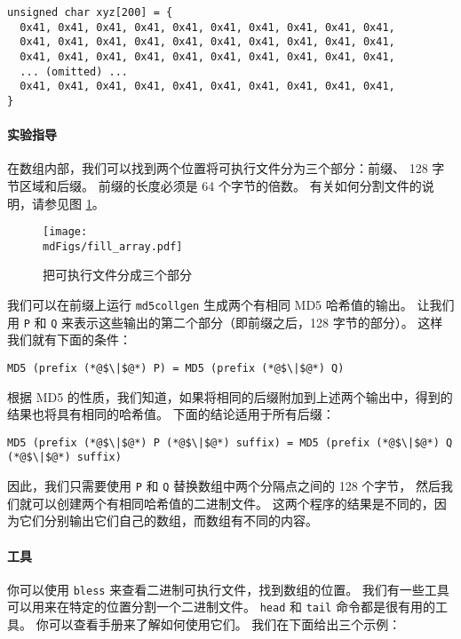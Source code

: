 \begin{lstlisting}
unsigned char xyz[200] = {
  0x41, 0x41, 0x41, 0x41, 0x41, 0x41, 0x41, 0x41, 0x41, 0x41,
  0x41, 0x41, 0x41, 0x41, 0x41, 0x41, 0x41, 0x41, 0x41, 0x41,
  0x41, 0x41, 0x41, 0x41, 0x41, 0x41, 0x41, 0x41, 0x41, 0x41,
  ... (omitted) ...
  0x41, 0x41, 0x41, 0x41, 0x41, 0x41, 0x41, 0x41, 0x41, 0x41,
}
\end{lstlisting}


\paragraph{实验指导}
在数组内部，我们可以找到两个位置将可执行文件分为三个部分：前缀、 128 字节区域和后缀。
前缀的长度必须是 64 个字节的倍数。
有关如何分割文件的说明，请参见图 \ref{md5:fig:fill_array}。

\begin{figure}[htb]
\centering
\texttt{[image: \\mdFigs/fill\_array.pdf]}
\caption{把可执行文件分成三个部分}
\label{md5:fig:fill_array}
\end{figure}

我们可以在前缀上运行 \texttt{md5collgen} 生成两个有相同 MD5 哈希值的输出。
让我们用 \texttt{P} 和 \texttt{Q} 来表示这些输出的第二个部分（即前缀之后，128 字节的部分）。
这样我们就有下面的条件：

\begin{lstlisting}
MD5 (prefix (*@$\|$@*) P) = MD5 (prefix (*@$\|$@*) Q)
\end{lstlisting}

根据 MD5 的性质，我们知道，如果将相同的后缀附加到上述两个输出中，得到的结果也将具有相同的哈希值。
下面的结论适用于所有后缀：

\begin{lstlisting}
MD5 (prefix (*@$\|$@*) P (*@$\|$@*) suffix) = MD5 (prefix (*@$\|$@*) Q (*@$\|$@*) suffix)
\end{lstlisting}

因此，我们只需要使用 \texttt{P} 和 \texttt{Q} 替换数组中两个分隔点之间的 128 个字节，
然后我们就可以创建两个有相同哈希值的二进制文件。
这两个程序的结果是不同的，因为它们分别输出它们自己的数组，而数组有不同的内容。


\paragraph{工具} 你可以使用 \texttt{bless} 来查看二进制可执行文件，找到数组的位置。
我们有一些工具可以用来在特定的位置分割一个二进制文件。
\texttt{head} 和 \texttt{tail} 命令都是很有用的工具。
你可以查看手册来了解如何使用它们。
我们在下面给出三个示例：

